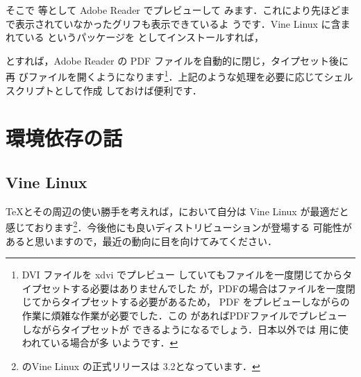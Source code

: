 そこで 等として Adobe Reader でプレビューして
みます．これにより先ほどまで表示されていなかったグリフも表示できているよ
うです．Vine Linux に含まれている というパッケージを
としてインストールすれば，
\begin{InTerm}
\end{InTerm}
とすれば，Adobe Reader の PDF ファイルを自動的に閉じ，タイプセット後に再
びファイルを開くようになります\footnote{DVI ファイルを xdvi でプレビュー
していてもファイルを一度閉じてからタイプセットする必要はありませんでした
が，PDFの場合はファイルを一度閉じてからタイプセットする必要があるため，
PDF をプレビューしながらの作業に煩雑な作業が必要でした．この
があればPDFファイルでプレビューしながらタイプセットが
できるようになるでしょう．日本以外では \PDFTeX 用に使われている場合が多
いようです．}．上記のような処理を必要に応じてシェルスクリプトとして作成
しておけば便利です．


\section{環境依存の話}



\subsection{Vine Linux}

\TeX とその周辺の使い勝手を考えれば，\genzai において自分は Vine Linux
が最適だと感じております\footnote{\genzai のVine Linux の正式リリースは
3.2となっています．}．今後他にも良いディストリビューションが登場する
可能性があると思いますので，最近の動向に目を向けてみてください．

\newcommand*\aptmac[1]{\textsf{#1}}
\newcommand*\aptitem[1]{\item[\aptmac{#1}]}
\newcommand*\rpmpac[1]{\item[\textsf{#1}]}
\newenvironment{rpmlist}{\begin{description}}{\end{description}}

